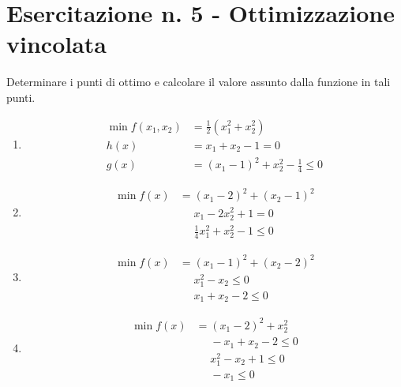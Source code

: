 \documentclass[italian,12pt]{article}
\begin{document}
\pagestyle{empty}

\section*{Esercitazione n. 5 - Ottimizzazione vincolata}

Determinare i punti di ottimo e calcolare il valore assunto dalla funzione in tali punti.

\begin{enumerate}[1)]
	\item %
		\begin{minipage}[c]{0.8\textwidth}%
			\begin{align*}
				\min f(x_{1},x_{2}) & =\frac{1}{2} (x_{1}^{2} + x_{2}^{2})\\
					h(x) & =x_{1}+x_{2}-1=0\\
					g(x) & =(x_{1}-1)^2 + x_{2}^2 - \frac{1}{4} \leq 0\end{align*}
			\end{minipage}
			
		\item %
		\begin{minipage}[c]{0.8\textwidth}%
			\begin{align*}
				\min f(x) & =(x_{1}-2)^{2}+(x_{2}-1)^{2}\\
					& \phantom{=}x_{1}-2x_{2}^2+1=0\\
					& \phantom{=}\frac{1}{4}x_{1}^2+x_{2}^2-1\leq 0\end{align*}
			\end{minipage}
		
		\item %
		\begin{minipage}[c]{0.8\textwidth}%
			\begin{align*}
				\min f(x) & =(x_{1}-1)^{2}+(x_{2}-2)^{2}\\
					& \phantom{=}x_{1}^2-x_{2} \leq 0\\
					& \phantom{=}x_{1}+x_{2}-2\leq 0\end{align*}
			\end{minipage}
			
		\item %
		\begin{minipage}[c]{0.8\textwidth}%
			\begin{align*}
				\min f(x) & =(x_{1}-2)^{2}+x_{2}^{2}\\
					& \phantom{=}-x_{1}+x_{2}-2 \leq 0\\
					& \phantom{=}x_{1}^2-x_{2}+1 \leq 0\\
					& \phantom{=}-x_1 \leq 0 \end{align*}
			\end{minipage}
			

\end{enumerate}
\end{document}

